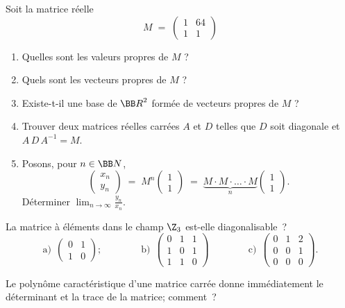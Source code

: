 \documentclass[12pt,french,oneside,a4paper]{memoir} %
\begin{document}
\begin{exo}
Soit la matrice réelle
\begin{equation*}
M\;=\; \left( \begin{array}{rr}
1 &64 \\
1 &1 \end{array} \right)
\end{equation*}
\begin{enumerate}
\item Quelles sont les valeurs propres de $M$ ?
\item Quels sont les vecteurs propres de $M$ ? 
\item Existe-t-il une base de ${\BB R}^2$ formée de vecteurs propres de 
$M$ ? 
\item Trouver deux matrices réelles carrées $A$ et $D$ telles que 
$D$ soit diagonale et $A\,D\,A^{-1}=M$.
\item Posons, pour $n \in {\BB N}$, 
\begin{equation*}
\left( \begin{array}{c}
x_n \\
y_n \end{array} \right) \;=\; M^n 
\left( \begin{array}{c}
1 \\
1 \end{array} \right) \;=\; 
\underbrace{M \cdot M \cdot \ldots \cdot M}_n 
\left( \begin{array}{c}
1 \\
1 \end{array} \right) .
\end{equation*}
Déterminer $\displaystyle{\lim_{n \rightarrow \infty} \frac{y_n}{x_n}}$. 
\end{enumerate}
\end{exo}
\begin{exo}
La matrice à éléments dans le champ $\Z_3$ est-elle diagonalisable~?
\begin{equation*}
\mathrm{a)}~~
\left( \begin{array}{rr}
0 &1 \\
1 &0 \end{array} \right) ;
\qquad\qquad\mathrm{b)}~~
\left( \begin{array}{rrr}
0 &1 &1 \\
1 &0 &1 \\
1 &1 &0 \end{array} \right)
\qquad\qquad\mathrm{c)}~~
\left( \begin{array}{rrr}
0 &1 &2 \\
0 &0 &1 \\
0 &0 &0 \end{array} \right).
\end{equation*}
\end{exo}
\begin{exo}
Le polynôme caractéristique d'une matrice carrée donne immédiatement le déterminant et la trace de la matrice; comment~?
\end{exo}
\end{document}
